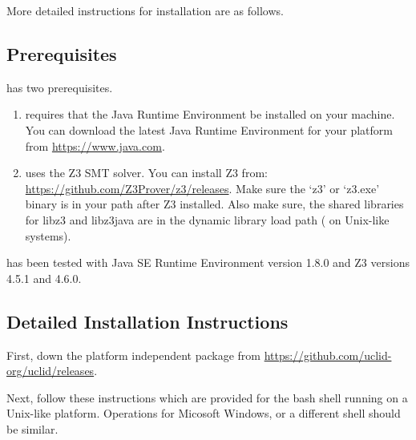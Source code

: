 More detailed instructions for installation are as follows.

\subsection{Prerequisites}

\uclid{} has two prerequisites. 
\begin{enumerate}
    \item \uclid{} requires that the Java\texttrademark{} Runtime Environment be installed on your machine. You can download the latest Java Runtime Environment for your platform from \url{https://www.java.com}. 
\item \uclid{} uses the Z3 SMT solver. You can install Z3 from: \url{https://github.com/Z3Prover/z3/releases}. Make sure the `z3' or `z3.exe' binary is in your path after Z3 installed. Also make sure, the shared libraries for libz3 and libz3java are in the dynamic library load path ( on Unix-like systems).
\end{enumerate}

\uclid{} has been tested with Java\texttrademark{} SE Runtime Environment version 1.8.0 and Z3 versions 4.5.1 and 4.6.0.

\subsection{Detailed Installation Instructions}

First, down the platform independent package from \url{https://github.com/uclid-org/uclid/releases}.

Next, follow these instructions which are provided for the bash shell running on a Unix-like platform. Operations for Micosoft Windows, or a different shell should be similar.

